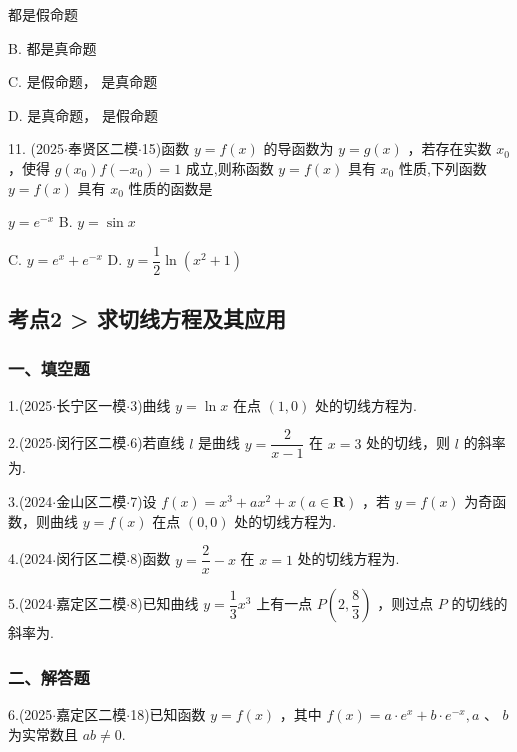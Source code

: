 \xx{}{}{}{}    都是假命题

B.     都是真命题

C.   是假命题，  是真命题

D.   是真命题，  是假命题

11. (2025$\cdot$奉贤区二模$\cdot$15)函数 $y = f\left( x\right)$ 的导函数为 $y = g\left( x\right)$ ，若存在实数 ${x}_{0}$ ，使得 $g\left( {x}_{0}\right) f\left( {-{x}_{0}}\right)  = 1$ 成立,则称函数 $y = f\left( x\right)$ 具有 ${x}_{0}$ 性质,下列函数 $y = f\left( x\right)$ 具有 ${x}_{0}$ 性质的函数是 \dotfill{(\kh{})}

\xx{}{}{}{}$y = {{e}}^{-x}$ B. $y = \sin x$

C. $y = {{e}}^{x} + {{e}}^{-x}$ D. $y = \dfrac{1}{2}\ln \left( {{x}^{2} + 1}\right)$

\subsection*{考点2 > 求切线方程及其应用}

\subsubsection*{一、填空题}

1.(2025$\cdot$长宁区一模$\cdot$3)曲线 $y = \ln x$ 在点 $\left( {1,0}\right)$ 处的切线方程为\blkda[2]{}.

2.(2025$\cdot$闵行区二模$\cdot$6)若直线 $l$ 是曲线 $y = \dfrac{2}{x - 1}$ 在 $x = 3$ 处的切线，则 $l$ 的斜率为\blkda[2]{}.

3.(2024$\cdot$金山区二模$\cdot$7)设 $f\left( x\right)  = {x}^{3} + a{x}^{2} + x\left( {a \in  \mathbf{R}}\right)$ ，若 $y = f\left( x\right)$ 为奇函数，则曲线 $y = f\left( x\right)$ 在点 $\left( {0,0}\right)$ 处的切线方程为\blkda[2]{}.

4.(2024$\cdot$闵行区二模$\cdot$8)函数 $y = \dfrac{2}{x} - x$ 在 $x = 1$ 处的切线方程为\blkda[2]{}.

5.(2024$\cdot$嘉定区二模$\cdot$8)已知曲线 $y = \dfrac{1}{3}{x}^{3}$ 上有一点 $P\left( {2,\dfrac{8}{3}}\right)$ ，则过点 $P$ 的切线的斜率为\blkda[2]{}.

\subsubsection*{二、解答题}

6.(2025$\cdot$嘉定区二模$\cdot$18)已知函数 $y = f\left( x\right)$ ，其中 $f\left( x\right)  = a \cdot  {{e}}^{x} + b \cdot  {{e}}^{-x},a$ 、 $b$ 为实常数且 ${ab} \neq  0$.


